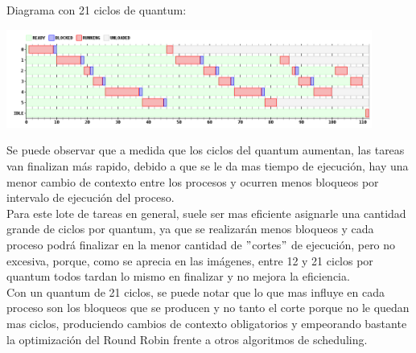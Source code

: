 \par Diagrama con 21 ciclos de quantum:
\begin {center}
\includegraphics[width=12cm]{../simusched/outputs/ej7/rr-ej7-1-21.png}
\end {center}

Se puede observar que a medida que los ciclos del quantum aumentan, las tareas van finalizan más rapido, debido a que se le da mas tiempo de ejecución, hay una menor cambio de contexto entre los procesos y ocurren menos bloqueos por intervalo de ejecución del proceso.
\\
Para este lote de tareas en general, suele ser mas eficiente asignarle una cantidad grande de ciclos por quantum,  ya que se realizarán menos bloqueos y cada proceso podrá finalizar en la menor cantidad de $"$cortes$"$ de ejecución, pero no excesiva, porque, como se aprecia en las imágenes, entre 12 y 21  ciclos por quantum todos tardan lo mismo en finalizar y no mejora la eficiencia.
\\
Con un quantum de 21 ciclos, se puede notar que lo que mas influye en cada proceso son los bloqueos que se producen y no tanto el corte porque no le quedan mas ciclos, produciendo cambios de contexto obligatorios y empeorando bastante la optimización del Round Robin frente a otros algoritmos de scheduling.


